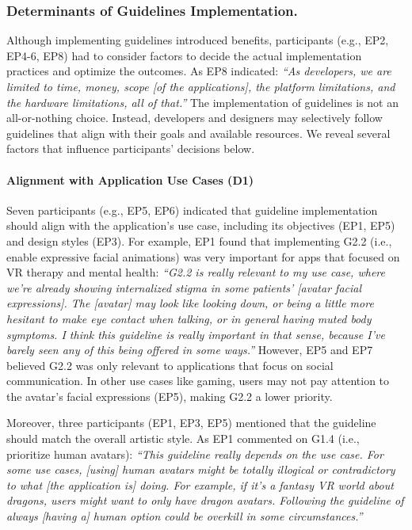 \subsubsection{Determinants of Guidelines Implementation.} \label{determinants}
Although implementing guidelines introduced benefits, participants (e.g., EP2, EP4-6, EP8) had to consider  factors to decide the actual implementation practices and optimize the outcomes. As EP8 indicated: \textit{``As developers, we are limited to time, money, scope [of the applications], the platform limitations, and the hardware limitations, all of that.''} The implementation of guidelines is not an all-or-nothing choice. Instead, developers and designers may selectively follow guidelines that align with their goals and available resources. We reveal several factors that influence participants' decisions below.


\paragraph{\textbf{Alignment with Application Use Cases (D1)}}
Seven participants (e.g., EP5, EP6) indicated that guideline implementation should align with the application's use case, including its objectives (EP1, EP5) and design styles (EP3). For example, EP1 found that implementing G2.2 (i.e., enable expressive facial animations) was very important for apps that focused on VR therapy and mental health: \textit{``G2.2 is really relevant to my use case, where we're already showing internalized stigma in some patients' [avatar facial expressions]. The [avatar] may look like looking down, or being a little more hesitant to make eye contact when talking, or in general having muted body symptoms. I think this guideline is really important in that sense, because I've barely seen any of this being offered in some ways.''}
However, EP5 and EP7 believed G2.2 was only relevant to applications that focus on social communication. In other use cases like gaming, users may not pay attention to the avatar's facial expressions (EP5), making G2.2 a lower priority.

Moreover, three participants (EP1, EP3, EP5) mentioned that the guideline should match the overall  artistic style. As EP1 commented on G1.4 (i.e., prioritize human avatars): \textit{``This guideline really depends on the use case. For some use cases, [using] human avatars might be totally illogical or contradictory to what [the application is] doing. For example, if it's a fantasy VR world about dragons, users might want to only have dragon avatars. Following the guideline of always [having a] human option could be overkill in some circumstances.''}

